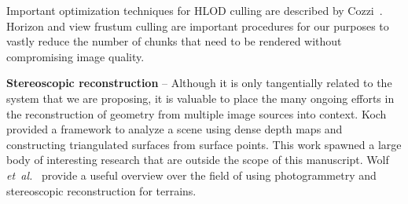 \documentclass[journal]{vgtc}                %
\newcommand{\etal}{\emph{et~al.}}
\begin{document}

Important optimization techniques for HLOD culling are described by Cozzi~\cite{cozzi2008visibility}. Horizon and view frustum culling are important procedures for our purposes to vastly reduce the number of chunks that need to be rendered without compromising image quality.




\noindent\textbf{Stereoscopic reconstruction} -- Although it is only tangentially related to the system that we are proposing, it is valuable to place the many ongoing efforts in the reconstruction of geometry from multiple image sources into context. Koch \cite{Koch95} provided a framework to analyze a scene using dense depth maps and constructing triangulated surfaces from surface points. This work spawned a large body of interesting research that are outside the scope of this manuscript. Wolf \etal~\cite{wolf2000elements} provide a useful overview over the field of using photogrammetry and stereoscopic reconstruction for terrains.
\end{document}
